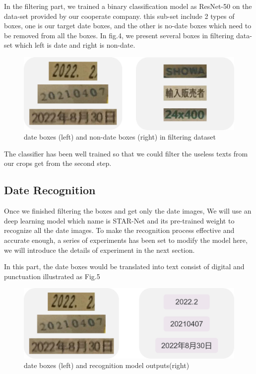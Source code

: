 \documentclass{article}
\begin{document}
In the filtering part, we trained a binary classification model as ResNet-50 on the data-set provided by our cooperate company. this sub-set include 2 types of boxes, one is our target date boxes, and the other is no-date boxes which need to be removed from all the boxes. In fig.4, we present several boxes in filtering data-set which left is date and right is non-date.

\begin{figure}[ht] \centering    
	\label{filtering}     
	\includegraphics[width=0.8\columnwidth]{filter.png}  
   
	\caption{date boxes (left) and non-date boxes (right) in filtering dataset}
\end{figure}

The classifier has been well trained so that we could filter the useless texts from our crops get from the second step.

\subsection{Date Recognition}

Once we finished filtering the boxes and get only the date images, We will use an deep learning model which name is STAR-Net and its pre-trained weight to recognize all the date images. To make the recognition process effective and accurate enough, a series of experiments has been set to modify the model here, we will introduce the details of experiment in the next section.\par
In this part, the date boxes would be translated into text consist of digital and punctuation illustrated as Fig.5

\begin{figure}[ht] \centering    
	\label{recognition}     
	\includegraphics[width=0.8\columnwidth]{recognition.png}  
   
	\caption{date boxes (left) and recognition model outputs(right)}
\end{figure}
\end{document}
